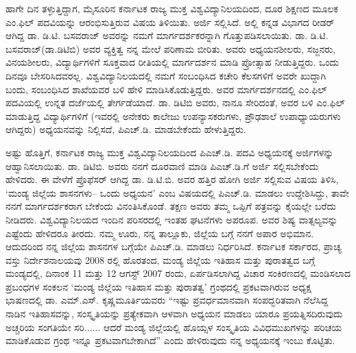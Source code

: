 ಹಾಗೇ ದಿನ ತಳ್ಳುತ್ತಿದ್ದಾಗ, ಮೈಸೂರಿನ ಕರ್ನಾಟಕ ರಾಜ್ಯ ಮುಕ್ತ ವಿಶ್ವವಿದ್ಯಾನಿಲಯದಿಂದ, ದೂರ ಶಿಕ್ಷಣದ ಮೂಲಕ ಎಂ.ಫಿಲ್​ ಪದವಿಯನ್ನು ಆರಂಭಿಸುತ್ತಿರುವ ವಿಷಯ ತಿಳಿಯಿತು. ಅರ್ಜಿ ಸಲ್ಲಿಸಿದೆ. ಅಲ್ಲಿ ಕನ್ನಡ ವಿಭಾಗದ ರೀಡರ್​ ಆಗಿದ್ದ ಡಾ. ಡಿ.ಟಿ. ಬಸವರಾಜ್​ ಅವರನ್ನು ನಮಗೆ ಮಾರ್ಗದರ್ಶಕರನ್ನಾಗಿ ಗೊತ್ತುಪಡಿಸಲಾಯಿತು. ಡಾ. ಡಿ.ಟಿ. ಬಸವರಾಜ್​(ಡಾ.ಡಿಟಿಬಿ) ಅವರ ವ್ಯಕ್ತಿತ್ವ ನನ್ನ ಮೇಲೆ ಪರಿಣಾಮ ಬೀರಿತು. ಅವರು ಅಧ್ಯಯನಶೀಲರು, ಸಜ್ಜನರು, ವಿನಯಶೀಲರು, ವಿದ್ಯಾರ್ಥಿಗಳಿಗೆ ಸೂಕ್ತವಾದ ರೀತಿಯಲ್ಲಿ ಮಾರ್ಗದರ್ಶನ ಮಾಡಿ ಪ್ರೋತ್ಸಾಹ ನೀಡುತ್ತಿದ್ದರು. ಒಂದು ದಿನವೂ ಬೇಸರಿಸಿದವರಲ್ಲ. ವಿಶ್ವವಿದ್ಯಾನಿಲಯದಲ್ಲಿ ನಮಗೆ ಸಂಬಂಧಿಸಿದ ಕಚೇರಿ ಕೆಲಸಗಳಿಗೆ ಅವರೇ ಖುದ್ದಾಗಿ ಬಂದು, ಸಂಬಂಧಿಸಿದ ಶಾಖೆಯವರ ಬಳಿ ಹೇಳಿ ಮಾಡಿಸಿಕೊಡುತ್ತಿದ್ದರು. ಅವರ ಮಾರ್ಗದರ್ಶನದಲ್ಲಿ ಎಂ.ಫಿಲ್​ ಪದವಿಯಲ್ಲಿ ಉನ್ನತ ದರ್ಜೆಯಲ್ಲಿ ತೇರ್ಗಡೆಯಾದೆ. ಡಾ. ಡಿಟಿಬಿ ಅವರು, ನಾನೂ ಸೇರಿದಂತೆ, ಅವರ ಬಳಿ ಎಂ.ಫಿಲ್​ ಮಾಡುತ್ತಿದ್ದ ವಿದ್ಯಾರ್ಥಿಗಳಿಗೆ (ಇವರಲ್ಲಿ ಅನೇಕರು ಕಾಲೇಜು ಉಪನ್ಯಾಸಕರುಗಳು, ಪ್ರೌಢಶಾಲೆ ಉಪಾಧ್ಯಾಯರುಗಳು ಆಗಿದ್ದರು) ಅಧ್ಯಯನವನ್ನು ನಿಲ್ಲಿಸದೆ, ಪಿಎಚ್​.ಡಿ. ಮಾಡಬೇಕೆಂದು ಹೇಳುತ್ತಿದ್ದರು.

ಅಷ್ಟು ಹೊತ್ತಿಗೆ, ಕರ್ನಾಟಕ ರಾಜ್ಯ ಮುಕ್ತ ವಿಶ್ವವಿದ್ಯಾನಿಲಯದಿಂದ ಪಿಎಚ್​.ಡಿ. ಪದವಿ ಅಧ್ಯಯನಕ್ಕೆ ಅರ್ಜಿಗಳನ್ನು ಆಹ್ವಾನಿಸಲಾಯಿತು. ಡಾ. ಡಿಟಿಬಿ. ಅವರು ನನಗೆ ದೂರವಾಣಿ ಮಾಡಿ ಪಿಎಚ್​.ಡಿ.ಗೆ ಅರ್ಜಿ ಸಲ್ಲಿಸಬೇಕೆಂದು ಹೇಳಿದರು. ಈ ವೇಳೆಗೆ ಪ್ರೊಫೆಸರ್​ ಆಗಿದ್ದ ಡಾ. ಡಿ.ಟಿ.ಬಿ. ಅವರ ಹತ್ತಿರ ಹೋಗಿ ಅರ್ಜಿ ಸಲ್ಲಿಸುವ ವಿಷಯ ತಿಳಿಸಿ, ‘ಮಂಡ್ಯ ಜಿಲ್ಲೆಯ ಶಾಸನಗಳು– ಒಂದು ಅಧ್ಯಯನ’ ಎಂಬ ವಿಷಯದಲ್ಲಿ ಪಿಎಚ್​.ಡಿ. ಮಾಡಲು ಉದ್ದೇಶಿಸಿದ್ದು, ತಾವೇ ನನಗೆ ಮಾರ್ಗದರ್ಶಕರಾಗ ಬೇಕೆಂದು ವಿನಂತಿಸಿಕೊಂಡೆ. ತಕ್ಷಣ ಅವರು ತಮ್ಮ ಒಪ್ಪಿಗೆ ಪತ್ರವನ್ನು ಕೈಯಲ್ಲೇ ಬರೆದು ನೀಡಿದರು. ವಿಶ್ವವಿದ್ಯಾನಿಲಯದ ಇಂದಿನ ಪರಿಸರದಲ್ಲಿ ಇಂತಹ ಘಟನೆಗಳು ಅಪರೂಪ. ಅವರ ಶಿಷ್ಯ ವಾತ್ಸಲ್ಯವನ್ನು ಎಷ್ಟೆಂದು ಹೇಳಿದರೂ ತೀರದು. ನಮ್ಮ ಊರು, ನನ್ನ ತಾಲ್ಲೂಕು, ಜಿಲ್ಲೆಯ ಬಗ್ಗೆ ನನಗೆ ಅಪಾರ ಅಭಿಮಾನ. ಆದುದರಿಂದ ನನ್ನ ಜಿಲ್ಲೆಯ ಶಾಸನಗಳ ಬಗ್ಗೆಯೇ ಪಿಎಚ್​.ಡಿ. ಮಾಡಲು ನಿರ್ಧರಿಸಿದೆ. ಕರ್ನಾಟಕ ಸರ್ಕಾರದ, ಪ್ರಾಚ್ಯ ವಸ್ತು ನಿರ್ದೇಶನಾಲಯವು 2008 ರಲ್ಲಿ ಹೊರತಂದ, ಮಂಡ್ಯ ಜಿಲ್ಲೆಯ ಇತಿಹಾಸ ಮತ್ತು ಪುರಾತತ್ವದ ಬಗ್ಗೆ ಮಂಡ್ಯದಲ್ಲಿ, ದಿನಾಂಕ 11 ಮತ್ತು 12 ಆಗಸ್ಟ್​ 2007 ರಂದು, ಏರ್ಪಡಿಸಲಾಗಿದ್ದ ವಿಚಾರ ಸಂಕಿರಣದಲ್ಲಿ ಮಂಡಿಸಲಾದ ಪ್ರಬಂಧಗಳ ಸಂಕಲನ ‘ಮಂಡ್ಯ ಜಿಲ್ಲೆಯ ಇತಿಹಾಸ ಮತ್ತು ಪುರಾತತ್ವ’ ಗ್ರಂಥದಲ್ಲಿ ಪ್ರಕಟವಾಗಿರುವ ಅಧ್ಯಕ್ಷ ಭಾಷಣದಲ್ಲಿ ಡಾ. ಎಮ್.ಎಸ್​. ಕೃಷ್ಣಮೂರ್ತಿಯವರು “ಇಷ್ಟು ಪ್ರವರ್ಧಮಾನವಾಗಿ ಸಂಪದ್ಭರಿತವಾಗಿ ನೆಲೆಸಿದ್ದ ನಾಡಿನ ಇತಿಹಾಸವನ್ನು, ಸಂಸ್ಕೃತಿಯನ್ನು ಪ್ರತ್ಯೇಕವಾಗಿ ಆಳವಾಗಿ ಅಧ್ಯಯನ ಮಾಡಲು ಯಾರೂ ಪ್ರಯತ್ನಿಸದಿರುವುದು ಅಚ್ಚರಿಯ ಸಂಗತಿಯೇ ಸರಿ...... ಆದರೆ ಮಂಡ್ಯ ಜಿಲ್ಲೆಯಲ್ಲಿ ಹೊಯ್ಸಳ ಸಂಸ್ಕೃತಿಯ ವಿವಿಧಮುಖಗಳನ್ನು ಪರಿಚಯ ಮಾಡಿಕೊಡುವ ಗ್ರಂಥ ಇನ್ನೂ ಪ್ರಕಟವಾಗಬೇಕಾಗಿದೆ” ಎಂದು ಹೇಳಿರುವುದು ನನ್ನ ಅಧ್ಯಯನಕ್ಕೆ ಇಂಬು ಕೊಟ್ಟಿತು. 

